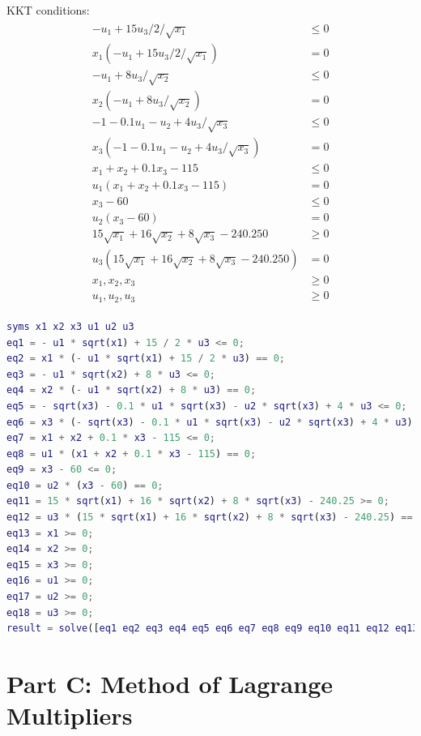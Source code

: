 \documentclass[fleqn,10pt]{wlscirep}
\begin{document}
KKT conditions:
\begin{align} \begin{split}
    - u_{1} + 15 u_{3} / 2 / \sqrt{x_{1}} & \leq 0 \\
    x_{1} (- u_{1} + 15 u_{3} / 2 / \sqrt{x_{1}}) & = 0 \\
    - u_{1} + 8 u_{3} / \sqrt{x_{2}} & \leq 0 \\
    x_{2} (- u_{1} + 8 u_{3} / \sqrt{x_{2}}) & = 0 \\
    - 1 - 0.1 u_{1} - u_{2} + 4 u_{3} / \sqrt{x_{3}} & \leq 0 \\
    x_{3} (- 1 - 0.1 u_{1} - u_{2} + 4 u_{3} / \sqrt{x_{3}}) & = 0 \\
    x_{1} + x_{2} + 0.1 x_{3} - 115 & \leq 0 \\
    u_{1} (x_{1} + x_{2} + 0.1 x_{3} - 115) & = 0 \\
    x_{3} - 60 &\leq 0 \\
    u_{2} (x_{3} - 60) &= 0 \\
    15 \sqrt{x_{1}} + 16 \sqrt{x_{2}} + 8 \sqrt{x_{3}} - 240.250 & \geq 0 \\
    u_{3} (15 \sqrt{x_{1}} + 16 \sqrt{x_{2}} + 8 \sqrt{x_{3}} - 240.250) & = 0 \\
    x_{1}, x_{2}, x_{3} &\geq 0 \\
    u_{1}, u_{2}, u_{3} &\geq 0
\end{split} \end{align} 

\begin{lstlisting}[language=MATLAB, caption=MATLAB code to solve the equations]
syms x1 x2 x3 u1 u2 u3
eq1 = - u1 * sqrt(x1) + 15 / 2 * u3 <= 0;
eq2 = x1 * (- u1 * sqrt(x1) + 15 / 2 * u3) == 0;
eq3 = - u1 * sqrt(x2) + 8 * u3 <= 0;
eq4 = x2 * (- u1 * sqrt(x2) + 8 * u3) == 0;
eq5 = - sqrt(x3) - 0.1 * u1 * sqrt(x3) - u2 * sqrt(x3) + 4 * u3 <= 0;
eq6 = x3 * (- sqrt(x3) - 0.1 * u1 * sqrt(x3) - u2 * sqrt(x3) + 4 * u3) == 0;
eq7 = x1 + x2 + 0.1 * x3 - 115 <= 0;
eq8 = u1 * (x1 + x2 + 0.1 * x3 - 115) == 0;
eq9 = x3 - 60 <= 0;
eq10 = u2 * (x3 - 60) == 0;
eq11 = 15 * sqrt(x1) + 16 * sqrt(x2) + 8 * sqrt(x3) - 240.25 >= 0;
eq12 = u3 * (15 * sqrt(x1) + 16 * sqrt(x2) + 8 * sqrt(x3) - 240.25) == 0;
eq13 = x1 >= 0;
eq14 = x2 >= 0;
eq15 = x3 >= 0;
eq16 = u1 >= 0;
eq17 = u2 >= 0;
eq18 = u3 >= 0;
result = solve([eq1 eq2 eq3 eq4 eq5 eq6 eq7 eq8 eq9 eq10 eq11 eq12 eq13 eq14 eq15])
\end{lstlisting}

\section{Part C: Method of Lagrange Multipliers}
\end{document}
